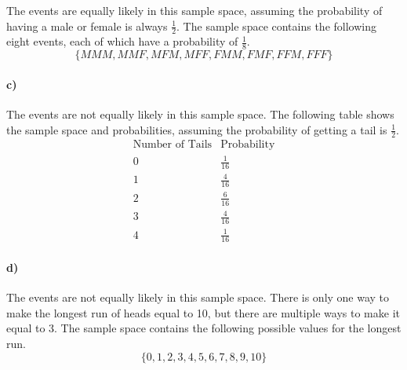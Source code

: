 \documentclass[12pt]{article}
\begin{document}
The events are equally likely in this sample space, assuming the probability of having
a male or female is always \(\frac{1}{2}\). The sample space contains the following
eight events, each of which have a probability of \(\frac{1}{8}\).
\[\{MMM, MMF, MFM, MFF, FMM, FMF, FFM, FFF\}\]

\paragraph{c)}

The events are not equally likely in this sample space. The following table shows
the sample space and probabilities, assuming the probability of getting a tail is
\(\frac{1}{2}\).
\[
    \begin{array}{c|c}
        \text{Number of Tails} & \text{Probability} \\
        \hline
        0 & \frac{1}{16} \\
        1 & \frac{4}{16} \\
        2 & \frac{6}{16} \\
        3 & \frac{4}{16} \\
        4 & \frac{1}{16}
    \end{array}
\]

\paragraph{d)}

The events are not equally likely in this sample space. There is only one way to
make the longest run of heads equal to 10, but there are multiple ways to
make it equal to 3. The sample space contains the following possible values
for the longest run.
\[\{0, 1, 2, 3, 4, 5, 6, 7, 8, 9, 10\}\]
\end{document}
